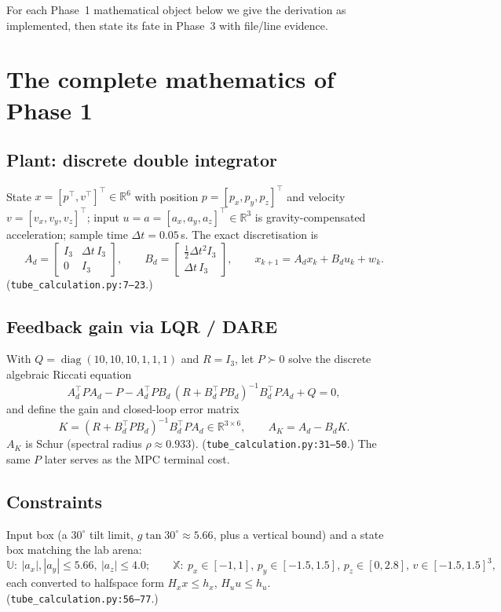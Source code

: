 \documentclass[11pt]{article}
\DeclareMathOperator{\diag}{diag}
\newcommand{\R}{\mathbb{R}}
\newcommand{\Xset}{\mathbb{X}}
\newcommand{\Uset}{\mathbb{U}}
\newcommand{\code}[1]{\texttt{#1}}
\begin{document}
For each Phase~1 mathematical object below we give the derivation as implemented, then state its
fate in Phase~3 with file/line evidence.

\section{The complete mathematics of Phase 1}

\subsection{Plant: discrete double integrator}
State $x=[p^\top,v^\top]^\top\in\R^6$ with position $p=[p_x,p_y,p_z]^\top$ and velocity
$v=[v_x,v_y,v_z]^\top$; input $u=a=[a_x,a_y,a_z]^\top\in\R^3$ is gravity-compensated acceleration;
sample time $\Delta t=0.05$\,s. The exact discretisation is
\begin{equation}
A_d=\begin{bmatrix}I_3 & \Delta t\,I_3\\ 0 & I_3\end{bmatrix},\qquad
B_d=\begin{bmatrix}\tfrac12\Delta t^2 I_3\\ \Delta t\,I_3\end{bmatrix},\qquad
x_{k+1}=A_dx_k+B_du_k+w_k .
\label{eq:p1plant}
\end{equation}
(\code{tube\_calculation.py:7--23}.)

\subsection{Feedback gain via LQR / DARE}
With $Q=\diag(10,10,10,1,1,1)$ and $R=I_3$, let $P\succ0$ solve the discrete algebraic Riccati
equation
\begin{equation}
A_d^\top P A_d - P - A_d^\top P B_d\,(R+B_d^\top P B_d)^{-1}B_d^\top P A_d + Q = 0,
\end{equation}
and define the gain and closed-loop error matrix
\begin{equation}
K=(R+B_d^\top P B_d)^{-1}B_d^\top P A_d\in\R^{3\times6},\qquad A_K=A_d-B_dK .
\label{eq:p1K}
\end{equation}
$A_K$ is Schur (spectral radius $\rho\approx0.933$). (\code{tube\_calculation.py:31--50}.)
The same $P$ later serves as the MPC terminal cost.

\subsection{Constraints}
Input box (a $30^\circ$ tilt limit, $g\tan30^\circ\approx5.66$, plus a vertical bound) and a state
box matching the lab arena:
\begin{equation}
\Uset:\ |a_x|,|a_y|\le5.66,\ |a_z|\le4.0;\qquad
\Xset:\ p_x\!\in\![-1,1],\,p_y\!\in\![-1.5,1.5],\,p_z\!\in\![0,2.8],\,v\!\in\![-1.5,1.5]^3,
\end{equation}
each converted to halfspace form $H_xx\le h_x$, $H_uu\le h_u$.
(\code{tube\_calculation.py:56--77}.)
\end{document}
